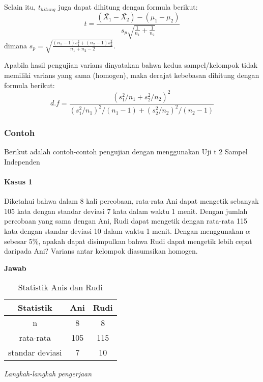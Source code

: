 \documentclass[
]{book}
\begin{document}
Selain itu, \(t_{hitung}\) juga dapat dihitung dengan formula berikut:
\[
t = \frac{(\bar{X_1}-\bar{X_2})-(\mu_1-\mu_2)}{s_p\sqrt{\frac{1}{n_1}+\frac{1}{n_2}}}
\]
dimana \(s_p = \sqrt{\frac{(n_1-1)s^2_1+(n_2-1)s^2_2}{n_1+n_2-2}}\).

Apabila hasil pengujian varians dinyatakan bahwa kedua sampel/kelompok tidak memiliki varians yang sama (homogen), maka derajat kebebasan dihitung dengan formula berikut:
\[
d.f = \frac{(s_1^2/n_1+s_2^2/n_2)^2}{(s_1^2/n_1)^2/(n_1-1)+(s_2^2/n_2)^2/(n_2-1)}
\]

\hypertarget{contoh}{%
\subsubsection{Contoh}\label{contoh}}

Berikut adalah contoh-contoh pengujian dengan menggunakan Uji t 2 Sampel Independen

\hypertarget{kasus-1}{%
\paragraph{Kasus 1}\label{kasus-1}}

Diketahui bahwa dalam 8 kali percobaan, rata-rata Ani dapat mengetik sebanyak 105 kata dengan standar deviasi 7 kata dalam waktu 1 menit. Dengan jumlah percobaan yang sama dengan Ani, Rudi dapat mengetik dengan rata-rata 115 kata dengan standar deviasi 10 dalam waktu 1 menit. Dengan menggunakan \(\alpha\) sebesar 5\%, apakah dapat disimpulkan bahwa Rudi dapat mengetik lebih cepat daripada Ani? Varians antar kelompok diasumsikan homogen.

\textbf{Jawab}\\

\begin{table}

\caption{\label{tab:anru-tab}Statistik Anis dan Rudi}
\centering
\begin{tabular}[t]{ccc}
\toprule
Statistik & Ani & Rudi\\
\midrule
n & 8 & 8\\
rata-rata & 105 & 115\\
standar deviasi & 7 & 10\\
\bottomrule
\end{tabular}
\end{table}

\emph{Langkah-langkah pengerjaan}
\end{document}
